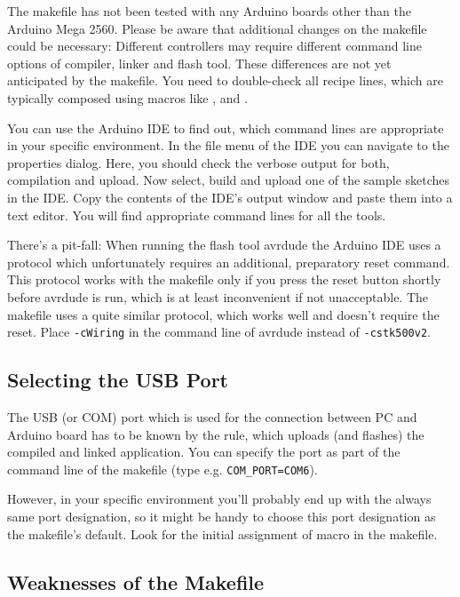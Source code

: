 The makefile has not been tested with any Arduino boards other than the
Arduino Mega 2560. Please be aware that additional changes on the
makefile could be necessary: Different controllers may require different
command line options of compiler, linker and flash tool. These differences
are not yet anticipated by the makefile. You need to double-check all
recipe lines, which are typically composed using macros like
,  and .

You can use the Arduino IDE to find out, which command lines are
appropriate in your specific environment. In the file menu of the IDE you
can navigate to the properties dialog. Here, you should check the verbose
output for both, compilation and upload. Now select, build and upload
one of the sample sketches in the IDE. Copy the contents of the IDE's
output window and paste them into a text editor. You will find appropriate
command lines for all the tools.

There's a pit-fall: When running the flash tool avrdude the Arduino IDE
uses a protocol which unfortunately requires an additional, preparatory
reset command. This protocol works with the makefile only if you press the
reset button shortly before avrdude is run, which is at least inconvenient
if not unacceptable. The makefile uses a quite similar protocol, which
works well and doesn't require the reset. Place \verb+-cWiring+ in the
command line of avrdude instead of \verb+-cstk500v2+.


\subsection{Selecting the USB Port}
\label{secSelectUSBPort}

The USB (or COM) port which is used for the connection between PC and
Arduino board has to be known by the rule, which uploads (and flashes)
the compiled and linked application. You can specify the port as part of
the command line of the makefile (type e.g. \verb+COM_PORT=COM6+).

However, in your specific environment you'll probably end up with the
always same port designation, so it might be handy to choose this port
designation as the makefile's default. Look for the initial assignment of
macro  in the makefile.


\subsection{Weaknesses of the Makefile}

